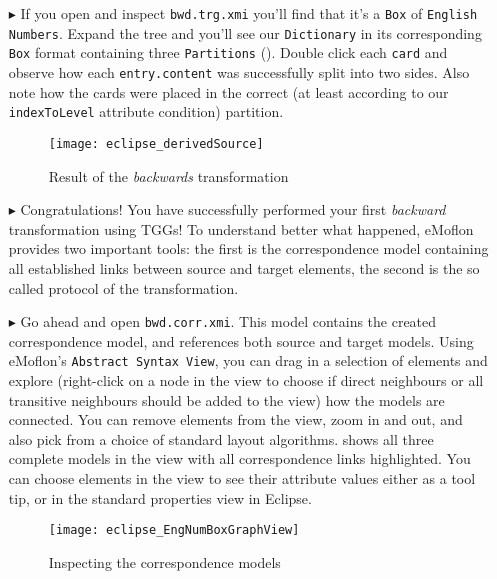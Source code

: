 \begin{itemize}
\item[$\blacktriangleright$] If you open and inspect \texttt{bwd.trg.xmi} you'll find that it's a \texttt{Box} of \texttt{English Numbers}.
Expand the tree and you'll see our \texttt{Dictionary} in its corresponding
\texttt{Box} format containing three \texttt{Par\-ti\-tions} (). 
Double click each \texttt{card} and observe how each \texttt{entry.content} was successfully split into two sides.
Also note how the cards were placed in the correct (at least according to our \texttt{indexToLevel} attribute condition) partition.

\begin{figure}[htbp]
\begin{center}
  \texttt{[image: eclipse\_derivedSource]}
  \caption{Result of the \emph{backwards} transformation}
  \label{eclipse:derivedBOX}
\end{center}
\end{figure}

\item[$\blacktriangleright$] Congratulations! You have successfully performed your first \emph{backward} transformation using TGGs!
To understand better what happened, eMoflon provides two important tools: the first is the correspondence model containing all established links between source and target elements, the second is the so called protocol of the transformation. 

\item[$\blacktriangleright$] Go ahead and open \texttt{bwd.corr.xmi}.
This model contains the created correspondence model, and references both source and target models.
Using eMoflon's \texttt{Abstract Syntax View}, you can drag in a selection of elements and explore (right-click on a node in the view to choose if direct neighbours or all transitive neighbours should be added to the view) how the models are connected.
You can remove elements from the view, zoom in and out, and also pick from a choice of standard layout algorithms.
 shows all three complete models in the view with all correspondence links highlighted. 
You can choose elements in the view to see their attribute values either as a tool tip, or in the standard properties view in Eclipse.

\begin{figure}[htb]
\begin{center}
  \texttt{[image: eclipse\_EngNumBoxGraphView]}
  \caption{Inspecting the correspondence models}
  \label{eclipse:graphView}
\end{center}
\end{figure}


\end{itemize}
